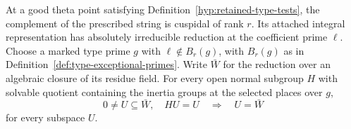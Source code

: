 \begin{proposition}\label{prop:retained-rank-complement}
At a good theta point satisfying Definition~\ref{hyp:retained-type-tests},
the complement of the prescribed string is cuspidal of rank \(r\).
Its attached integral representation has absolutely irreducible
reduction at the coefficient prime \(\ell\). Choose a marked type
prime \(g\) with \(\ell\notin B_r(g)\), with \(B_r(g)\) as in Definition~\ref{def:type-exceptional-primes}. Write \(\bar W\) for the reduction over an algebraic closure of its residue field. For every open normal subgroup \(H\) with solvable quotient containing the inertia groups at the selected places over \(g\),
\[
 0\ne U\subseteq\bar W,\quad HU=U\quad\Longrightarrow\quad U=\bar W
\]
for every subspace \(U\).
\end{proposition}

